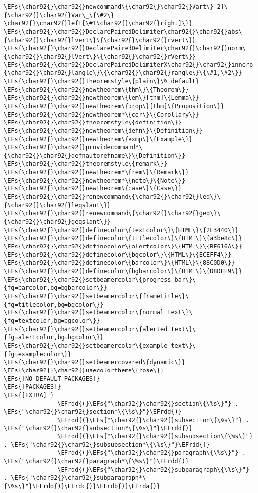 \documentclass[12pt]{article}
\theoremstyle{plain}%
\theoremstyle{definition}
\theoremstyle{remark}
\newcommand{\EFs}[1]{\textcolor{EFs}{#1}} %
\newcommand{\EFrda}[1]{\textcolor{EFrda}{#1}} %
\newcommand{\EFrdb}[1]{\textcolor{EFrdb}{#1}} %
\newcommand{\EFrdc}[1]{\textcolor{EFrdc}{#1}} %
\newcommand{\EFrdd}[1]{\textcolor{EFrdd}{#1}} %
\begin{document}
\begin{Code}
\begin{Verbatim}
\EFs{\char92{}\char92{}newcommand\{\char92{}\char92{}Vart\}[2]\{\char92{}\char92{}Var\_\{\#2\} \char92{}\char92{}left[\#1\char92{}\char92{}right]\}}
\EFs{\char92{}\char92{}DeclarePairedDelimiter\char92{}\char92{}abs\{\char92{}\char92{}lvert\}\{\char92{}\char92{}rvert\}}
\EFs{\char92{}\char92{}DeclarePairedDelimiter\char92{}\char92{}norm\{\char92{}\char92{}lVert\}\{\char92{}\char92{}rVert\}}
\EFs{\char92{}\char92{}DeclarePairedDelimiterX\char92{}\char92{}innerp[2]\{\char92{}\char92{}langle\}\{\char92{}\char92{}rangle\}\{\#1,\#2\}}
\EFs{\char92{}\char92{}theoremstyle\{plain\}\% default}
\EFs{\char92{}\char92{}newtheorem\{thm\}\{Theorem\}}
\EFs{\char92{}\char92{}newtheorem\{lem\}[thm]\{Lemma\}}
\EFs{\char92{}\char92{}newtheorem\{prop\}[thm]\{Proposition\}}
\EFs{\char92{}\char92{}newtheorem*\{cor\}\{Corollary\}}
\EFs{\char92{}\char92{}theoremstyle\{definition\}}
\EFs{\char92{}\char92{}newtheorem\{defn\}\{Definition\}}
\EFs{\char92{}\char92{}newtheorem\{exmp\}\{Example\}}
\EFs{\char92{}\char92{}providecommand*\{\char92{}\char92{}defnautorefname\}\{Definition\}}
\EFs{\char92{}\char92{}theoremstyle\{remark\}}
\EFs{\char92{}\char92{}newtheorem*\{rem\}\{Remark\}}
\EFs{\char92{}\char92{}newtheorem*\{note\}\{Note\}}
\EFs{\char92{}\char92{}newtheorem\{case\}\{Case\}}
\EFs{\char92{}\char92{}renewcommand\{\char92{}\char92{}leq\}\{\char92{}\char92{}leqslant\}}
\EFs{\char92{}\char92{}renewcommand\{\char92{}\char92{}geq\}\{\char92{}\char92{}geqslant\}}
\EFs{\char92{}\char92{}definecolor\{textcolor\}\{HTML\}\{2E3440\}}
\EFs{\char92{}\char92{}definecolor\{titlecolor\}\{HTML\}\{a3be8c\}}
\EFs{\char92{}\char92{}definecolor\{alertcolor\}\{HTML\}\{BF616A\}}
\EFs{\char92{}\char92{}definecolor\{bgcolor\}\{HTML\}\{ECEFF4\}}
\EFs{\char92{}\char92{}definecolor\{barcolor\}\{HTML\}\{88C0D0\}}
\EFs{\char92{}\char92{}definecolor\{bgbarcolor\}\{HTML\}\{D8DEE9\}}
\EFs{\char92{}\char92{}setbeamercolor\{progress bar\}\{fg=barcolor,bg=bgbarcolor\}}
\EFs{\char92{}\char92{}setbeamercolor\{frametitle\}\{fg=titlecolor,bg=bgcolor\}}
\EFs{\char92{}\char92{}setbeamercolor\{normal text\}\{fg=textcolor,bg=bgcolor\}}
\EFs{\char92{}\char92{}setbeamercolor\{alerted text\}\{fg=alertcolor,bg=bgcolor\}}
\EFs{\char92{}\char92{}setbeamercolor\{example text\}\{fg=examplecolor\}}
\EFs{\char92{}\char92{}setbeamercovered\{dynamic\}}
\EFs{\char92{}\char92{}usecolortheme\{rose\}}
\EFs{[NO-DEFAULT-PACKAGES]}
\EFs{[PACKAGES]}
\EFs{[EXTRA]"}
               \EFrdd{(}\EFs{"\char92{}\char92{}section\{\%s\}"} . \EFs{"\char92{}\char92{}section*\{\%s\}"}\EFrdd{)}
               \EFrdd{(}\EFs{"\char92{}\char92{}subsection\{\%s\}"} . \EFs{"\char92{}\char92{}subsection*\{\%s\}"}\EFrdd{)}
               \EFrdd{(}\EFs{"\char92{}\char92{}subsubsection\{\%s\}"} . \EFs{"\char92{}\char92{}subsubsection*\{\%s\}"}\EFrdd{)}
               \EFrdd{(}\EFs{"\char92{}\char92{}paragraph\{\%s\}"} . \EFs{"\char92{}\char92{}paragraph*\{\%s\}"}\EFrdd{)}
               \EFrdd{(}\EFs{"\char92{}\char92{}subparagraph\{\%s\}"} . \EFs{"\char92{}\char92{}subparagraph*\{\%s\}"}\EFrdd{)}\EFrdc{)}\EFrdb{)}\EFrda{)}
\end{Verbatim}
\end{Code}
\end{document}
